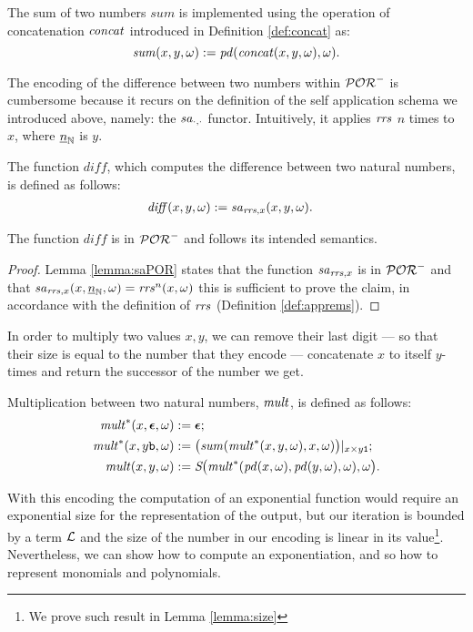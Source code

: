 \begin{defn}[Sum]
The sum of two numbers $\mathit{sum}$
is implemented using the operation of concatenation
$\mathit{concat}$ introduced in Definition \ref{def:concat} as:
$$
\mathit{sum}(x, y, \omega) := \mathit{pd}(\mathit{concat}(x, y, \omega), \omega).
$$
\end{defn}

The encoding of the difference
between two numbers within $\mathcal{POR}^-$ is cumbersome
because it recurs on the definition of
the self application schema we introduced above, namely: the $\mathit{sa}_{\cdot, \cdot}$
functor.
Intuitively, it applies $\mathit{rrs}$ $n$ times to $x$,
where ${\underline{n}}_{\mathbb{N}}$ is $y$.

\begin{defn}[Difference]
The function $\mathit{diff}$, which computes
the difference between two natural numbers,
is defined as follows:
\begin{align*}
\mathit{diff}(x, y, \omega) &:= \mathit{sa}_{\mathit{rrs}, x}(x, y, \omega).
\end{align*}
\end{defn}
%
\begin{remark}
  The function $\mathit{diff}$ is in $\mathcal{POR}^-$ and follows its intended semantics.
\end{remark}
\begin{proof}
    Lemma \ref{lemma:saPOR} states that the function $\mathit{sa}_{\mathit{rrs}, x}$ is in
    $\mathcal{POR}^-$ and that $\mathit{sa}_{\mathit{rrs}, x}(x, {\underline{n}}_{\mathbb{N}}, \omega)=\mathit{rrs}^n(x, \omega)$
    this is sufficient to prove the claim, in accordance with the definition
    of $\mathit{rrs}$ (Definition \ref{def:apprems}).
\end{proof}

%
%
\noindent
In order to multiply two values $x,y$,
we can remove their last digit --- so that their size
is equal to the number that they encode ---
concatenate $x$ to itself $y$-times and
return the successor of the number we get.

\begin{defn}[Multiplication]
Multiplication between two natural numbers,
$\mathit{mult}$, is defined
as follows:
\begin{align*}
{\mathit{mult}^*}(x,  \bm{\epsilon}, \omega) &:= \bm{\epsilon}; \\
{\mathit{mult}^*}(x, y\mathtt{b}, \omega) &:= \big(\mathit{sum}(\mathit{mult}^*(x, y, \omega),
x, \omega)\big)|_{x\times y\mathtt{1}}; \\
\mathit{mult}(x, y, \omega) &:= \emph{S}\big( \mathit{mult}^*(\mathit{pd}(x,\omega),
\mathit{pd}(y,\omega), \omega), \omega\big).
\end{align*}
\end{defn}
%
%
\noindent
With this encoding the computation of an exponential function
would require an exponential size for the representation
of the output, but our iteration is bounded by a term $\mathcal{L}$
and the size of the number in our encoding is
linear in its value\footnote{We prove such result in Lemma \ref{lemma:size}}.
Nevertheless, we can show how to compute an exponentiation, and so
how to represent monomials and polynomials.

